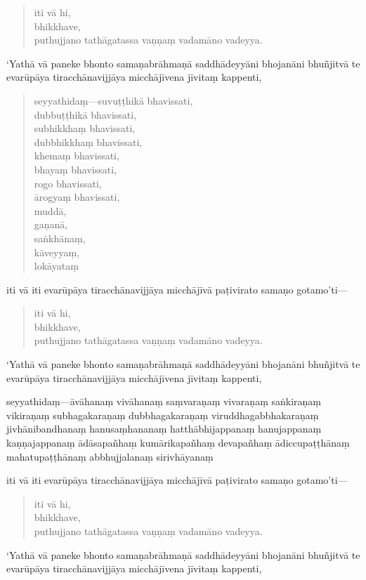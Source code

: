 \documentclass[11pt,twoside,openright]{book}
\begin{document}
\begin{verse}
iti vā hi,\\
\vin  bhikkhave,\\
\vin  puthujjano tathāgatassa vaṇṇaṃ vadamāno vadeyya.

\end{verse}
\pstart
‘Yathā vā paneke bhonto samaṇabrāhmaṇā saddhādeyyāni bhojanāni bhuñjitvā te evarūpāya tiracchānavijjāya micchājīvena jīvitaṃ kappenti,
\pend

\begin{verse}
seyyathidaṃ—suvuṭṭhikā bhavissati,\\
\vin  dubbuṭṭhikā bhavissati,\\
\vin  subhikkhaṃ bhavissati,\\
\vin  dubbhikkhaṃ bhavissati,\\
\vin  khemaṃ bhavissati,\\
\vin  bhayaṃ bhavissati,\\
\vin  rogo bhavissati,\\
\vin  ārogyaṃ bhavissati,\\
\vin  muddā,\\
\vin  gaṇanā,\\
\vin  saṅkhānaṃ,\\
\vin  kāveyyaṃ,\\
\vin  lokāyataṃ

\end{verse}
\pstart
iti vā iti evarūpāya tiracchānavijjāya micchājīvā paṭivirato samaṇo gotamo’ti—
\pend

\begin{verse}
iti vā hi,\\
\vin  bhikkhave,\\
\vin  puthujjano tathāgatassa vaṇṇaṃ vadamāno vadeyya.

\end{verse}
\pstart
‘Yathā vā paneke bhonto samaṇabrāhmaṇā saddhādeyyāni bhojanāni bhuñjitvā te evarūpāya tiracchānavijjāya micchājīvena jīvitaṃ kappenti,
\pend

\pstart
seyyathidaṃ—āvāhanaṃ vivāhanaṃ saṃvaraṇaṃ vivaraṇaṃ saṅkiraṇaṃ vikiraṇaṃ subhagakaraṇaṃ dubbhagakaraṇaṃ viruddhagabbhakaraṇaṃ jivhānibandhanaṃ hanusaṃhananaṃ hatthābhijappanaṃ hanujappanaṃ kaṇṇajappanaṃ ādāsapañhaṃ kumārikapañhaṃ devapañhaṃ ādiccupaṭṭhānaṃ mahatupaṭṭhānaṃ abbhujjalanaṃ sirivhāyanaṃ
\pend

\pstart
iti vā iti evarūpāya tiracchānavijjāya micchājīvā paṭivirato samaṇo gotamo’ti—
\pend

\begin{verse}
iti vā hi,\\
\vin  bhikkhave,\\
\vin  puthujjano tathāgatassa vaṇṇaṃ vadamāno vadeyya.

\end{verse}
\pstart
‘Yathā vā paneke bhonto samaṇabrāhmaṇā saddhādeyyāni bhojanāni bhuñjitvā te evarūpāya tiracchānavijjāya micchājīvena jīvitaṃ kappenti,
\pend
\end{document}
